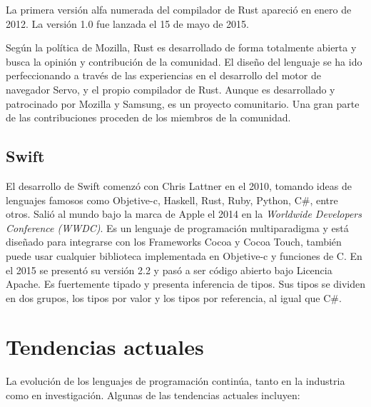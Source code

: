 \documentclass[twoside,twocolumn]{article}
\begin{document}
La primera versión alfa numerada del compilador de Rust apareció en enero de 2012. La versión 1.0 fue lanzada el 15 de mayo de 2015.

Según la política de Mozilla, Rust es desarrollado de forma totalmente abierta y busca la opinión y contribución de la comunidad. El diseño del lenguaje se ha ido perfeccionando a través de las experiencias en el desarrollo del motor de navegador Servo, y el propio compilador de Rust. Aunque es desarrollado y patrocinado por Mozilla y Samsung, es un proyecto comunitario. Una gran parte de las contribuciones proceden de los miembros de la comunidad.

\subsection{Swift}
El desarrollo de Swift comenzó con Chris Lattner en el 2010, tomando ideas de lenguajes famosos como Objetive-c, Haskell, Rust, Ruby, Python, C\#, entre otros. Salió al mundo bajo la marca de Apple el 2014 en la \textit{Worldwide Developers Conference (WWDC)}. Es un lenguaje de programación multiparadigma y está diseñado para integrarse con los Frameworks Cocoa y Cocoa Touch, también puede usar cualquier biblioteca implementada en Objetive-c y funciones de C. En el 2015 se presentó su versión 2.2 y pasó a ser código abierto bajo Licencia Apache. Es fuertemente tipado y presenta inferencia de tipos. Sus tipos se dividen en dos grupos, los tipos por valor y los tipos por referencia, al igual que C\#.


\section{Tendencias actuales}

La evolución de los lenguajes de programación continúa, tanto en la industria como en investigación. Algunas de las tendencias actuales incluyen:
\end{document}
